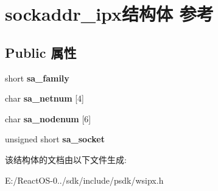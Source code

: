 \hypertarget{structsockaddr__ipx}{}\section{sockaddr\+\_\+ipx结构体 参考}
\label{structsockaddr__ipx}
\subsection*{Public 属性}
\begin{DoxyCompactItemize}
\item 
\mbox{\label{structsockaddr__ipx_a5e8896142bab9ff30bfc7a93d52cc9a9}} 
short {\bfseries sa\+\_\+family}
\item 
\mbox{\label{structsockaddr__ipx_afa6390d73c99e591ca1603dce5ae3428}} 
char {\bfseries sa\+\_\+netnum} \mbox{[}4\mbox{]}
\item 
\mbox{\label{structsockaddr__ipx_af1d8e428d1a7226fe3bfee75ff3fc7b6}} 
char {\bfseries sa\+\_\+nodenum} \mbox{[}6\mbox{]}
\item 
\mbox{\label{structsockaddr__ipx_aa02219c81d4e1f41ed05524888ac6a70}} 
unsigned short {\bfseries sa\+\_\+socket}
\end{DoxyCompactItemize}


该结构体的文档由以下文件生成\+:\begin{DoxyCompactItemize}
\item 
E\+:/\+React\+O\+S-\/0../sdk/include/psdk/wsipx.\+h\end{DoxyCompactItemize}
